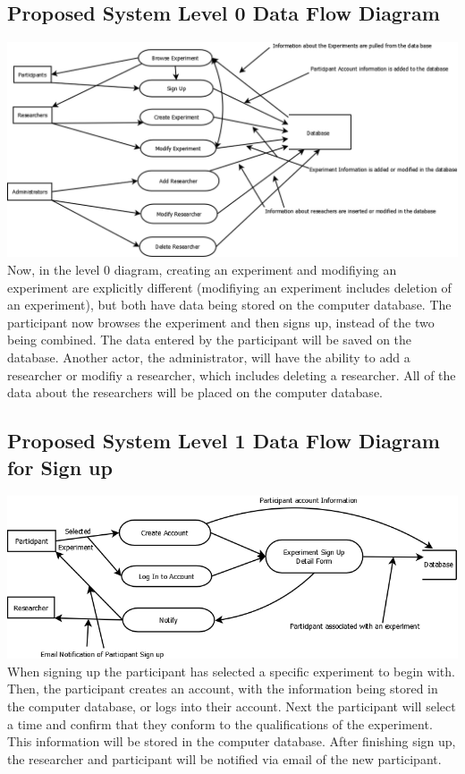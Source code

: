 \subsection{Proposed System Level 0 Data Flow Diagram}
\includegraphics[width=6in]{../other/data-flow-diagrams/new_system_level_0.png}\\
Now, in the level 0 diagram, creating an experiment and modifiying an experiment are explicitly different (modifiying an experiment includes deletion of an experiment), but both have data being stored on the computer database.  The participant now browses the experiment and then signs up, instead of the two being combined.  The data entered by the participant will be saved on the database.  Another actor, the administrator, will have the ability to add a researcher or modifiy a researcher, which includes deleting a researcher.  All of the data about the researchers will be placed on the computer database.

\subsection{Proposed System Level 1 Data Flow Diagram for Sign up}
\includegraphics[width=6in]{../other/data-flow-diagrams/new_system_level_21.png}
When signing up the participant has selected a specific experiment to begin with.  Then, the participant creates an account, with the information being stored in the computer database, or logs into their account.  Next the participant will select a time and confirm that they conform to the qualifications of the experiment.  This information will be stored in the computer database.  After finishing sign up, the researcher and participant will be notified via email of the new participant.



